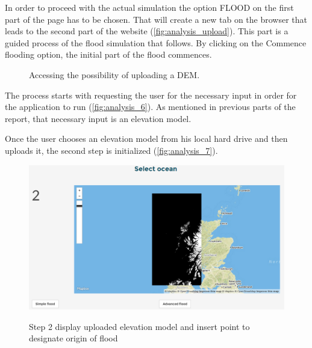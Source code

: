In order to proceed with the actual simulation the option FLOOD on the first part of the page has to be chosen. That will create a new tab on the browser that leads to the second part of the website (\autoref{fig:analysis_upload}). This part is a guided process of the flood simulation that follows. By clicking on the Commence flooding option, the initial part of the flood commences.

\begin{figure}[p]
  \myfloatalign
   \quad
   \quad
 \caption{Accessing the possibility of uploading a DEM.}
 \label{fig:analysis_upload}
\end{figure}

The process starts with requesting the user for the necessary input in order for the application to run (\autoref{fig:analysis_6}). As mentioned in previous parts of the report, that necessary input is an elevation model. 

Once the user chooses an elevation model from his local hard drive and then uploads it, the second step is initialized (\autoref{fig:analysis_7}). 


\begin{figure}[h!]
\centering
	{\includegraphics[width=\linewidth]{gfx/Analysis_Website/7.png}}
\caption{Step 2 display uploaded elevation model and insert point to designate origin of flood}
\label{fig:analysis_7}
\end{figure}

